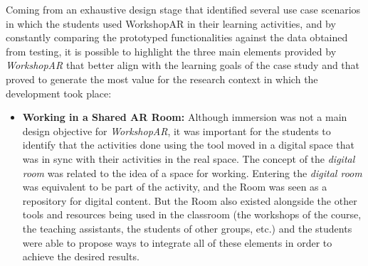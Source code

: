 Coming from an exhaustive design stage that identified several use case scenarios in which the students used WorkshopAR in their learning activities, and by constantly comparing the
prototyped functionalities against the data obtained from testing, it is possible to highlight the three main elements provided by \emph{WorkshopAR} that better align with the learning
goals of the case study and that proved to generate the most value for the research context in which the development took place:

\begin{itemize}
    \item \textbf{Working in a Shared AR Room:} Although immersion was not a main design objective for \emph{WorkshopAR}, it was important for the students to identify that the activities
    done using the tool moved in a digital space that was in sync with their activities in the real space. The concept of the \emph{digital room} was related to the idea of a space for
    working. Entering the \emph{digital room} was equivalent to be part of the activity, and the Room was seen as a repository for digital content. But the Room also existed alongside the
    other tools and resources being used in the classroom (the workshops of the course, the teaching assistants, the students of other groups, etc.) and the students were able to propose
    ways to integrate all of these elements in order to achieve the desired results.


\end{itemize}
